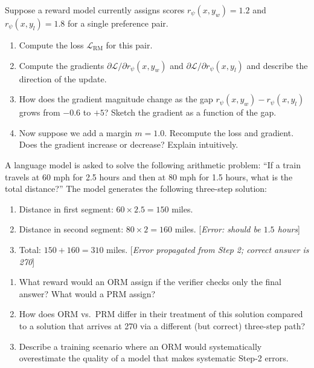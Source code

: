 \begin{exercise}
\label{ex:rm-loss-worked}
Suppose a reward model currently assigns scores $r_\psi(x, y_w) = 1.2$ and $r_\psi(x, y_l) = 1.8$ for a single preference pair.
\begin{enumerate}
  \item Compute the loss $\mathcal{L}_{\mathrm{RM}}$ for this pair.
  \item Compute the gradients $\partial\mathcal{L}/\partial r_\psi(x,y_w)$ and $\partial\mathcal{L}/\partial r_\psi(x,y_l)$ and describe the direction of the update.
  \item How does the gradient magnitude change as the gap $r_\psi(x,y_w) - r_\psi(x,y_l)$ grows from $-0.6$ to $+5$? Sketch the gradient as a function of the gap.
  \item Now suppose we add a margin $m = 1.0$. Recompute the loss and gradient. Does the gradient increase or decrease? Explain intuitively.
\end{enumerate}
\end{exercise}

\begin{exercise}
\label{ex:orm-prm}
A language model is asked to solve the following arithmetic problem: ``If a train travels at 60 mph for 2.5 hours and then at 80 mph for 1.5 hours, what is the total distance?'' The model generates the following three-step solution:
\begin{enumerate}
  \item[Step 1:] Distance in first segment: $60 \times 2.5 = 150$ miles.
  \item[Step 2:] Distance in second segment: $80 \times 2 = 160$ miles. [\emph{Error: should be $1.5$ hours}]
  \item[Step 3:] Total: $150 + 160 = 310$ miles. [\emph{Error propagated from Step 2; correct answer is 270}]
\end{enumerate}
\begin{enumerate}
  \item What reward would an ORM assign if the verifier checks only the final answer? What would a PRM assign?
  \item How does ORM vs.\ PRM differ in their treatment of this solution compared to a solution that arrives at 270 via a different (but correct) three-step path?
  \item Describe a training scenario where an ORM would systematically overestimate the quality of a model that makes systematic Step-2 errors.
\end{enumerate}
\end{exercise}

